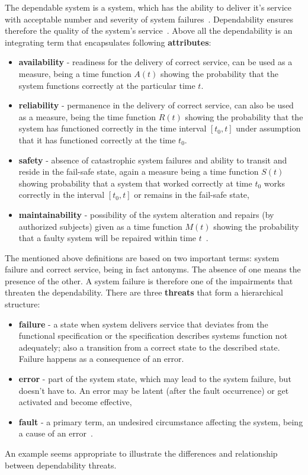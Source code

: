 The dependable system is a system, which has the ability to deliver it's service with acceptable number and severity of system failures~\cite{art:Avizienis}. Dependability ensures therefore the quality of the system's service~\cite{art:Laprie}. Above all the dependability is an integrating term that encapsulates following \textbf{attributes}:
\begin{itemize}
\item \textbf{availability} - readiness for the delivery of correct service, can be used as a  measure, being a time function $A(t)$ showing the probability that the system functions correctly at the particular time $t$. 
\item \textbf{reliability} - permanence in the delivery of correct service, can also be used as a measure, being the time function $R(t)$ showing the probability that the system has functioned correctly in the time interval $[t_0,t]$ under assumption that it has functioned correctly at the time $t_0$.
\item \textbf{safety} - absence of catastrophic system failures and ability to transit and reside in the fail-safe state, again a measure being a time function $S(t)$ showing probability that a system that worked correctly at time $t_0$ works correctly in the interval $[t_0,t]$ or remains in the fail-safe state,
\item \textbf{maintainability} - possibility of the system alteration and repairs (by authorized subjects) given as a time function $M(t)$ showing the probability that a faulty system will be repaired within time $t$~\cite{art:Laprie, art:Avizienis, art:Avizienis2}.
\end{itemize}
The mentioned above definitions are based on two important terms: system failure and correct service, being in fact antonyms. The absence of one means the presence of the other. A system failure is therefore one of the impairments that threaten the dependability. There are three \textbf{threats} that form a hierarchical structure:
\begin{itemize}
    \item \textbf{failure} - a state when system delivers service that deviates from the functional specification or the specification describes systems function not adequately; also a transition from a correct state to the described state. Failure happens as a consequence of an error.
    \item \textbf{error} - part of the system state, which may lead to the system failure, but doesn't have to. An error may be latent (after the fault occurrence) or get activated and become effective,
    \item \textbf{fault} - a primary term, an undesired circumstance affecting the system, being a cause of an error~\cite{art:Avizienis, art:Avizienis2}. 
\end{itemize}
An example seems appropriate to illustrate the differences and relationship between dependability threats. 

